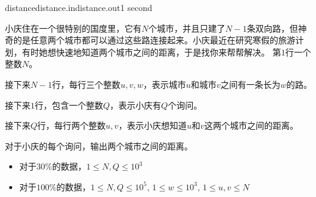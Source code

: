 \documentclass[11pt,a4paper,oneside]{article}
\begin{document}
	
\begin{problem}{distance}{distance.in}{distance.out}{1 second} 

	小庆住在一个很特别的国度里，它有$N$个城市，并且只建了$N-1$条双向路，但神奇的是任意两个城市都可以通过这些路连接起来。小庆最近在研究寒假的旅游计划，有时她想快速地知道两个城市之间的距离，于是找你来帮帮解决。
    \InputFile
	第$1$行一个整数$N$。	
	
	接下来$N-1$行，每行三个整数$u, v, w$，表示城市$u$和城市$v$之间有一条长为$w$的路。
	
	接下来$1$行，包含一个整数$Q$，表示小庆有$Q$个询问。
	
	接下来$Q$行，每行两个整数$u,v$，表示小庆想知道$u$和$v$这两个城市之间的距离。
	
    \OutputFile

	对于小庆的每个询问，输出两个城市之间的距离。
	
    \Example

    \begin{example}
    \end{example}

    \Note
    
    \begin{itemize}
		\item 对于$30\%$的数据，$1 \leq N, Q \leq 10^3$
		\item 对于$100\%$的数据，$1 \leq N, Q \leq 10^5$, $1 \leq w \leq 10^3$, $1 \leq u, v \leq N$ 
    \end{itemize}

\end{problem}
\end{document}
